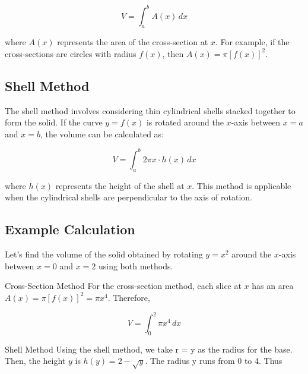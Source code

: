 \documentclass{article}
\begin{document}
\[
V = \int_{a}^{b} A(x) \, dx
\]

where $A(x)$ represents the area of the cross-section at $x$. For example, if the cross-sections are circles with radius $f(x)$, then $A(x) = \pi [f(x)]^2$.

\subsection{Shell Method}
The shell method involves considering thin cylindrical shells stacked together to form the solid. If the curve $y = f(x)$ is rotated around the $x$-axis between $x = a$ and $x = b$, the volume can be calculated as:

\[
V = \int_{a}^{b} 2\pi x \cdot h(x) \, dx
\]

where $h(x)$ represents the height of the shell at $x$. This method is applicable when the cylindrical shells are perpendicular to the axis of rotation.

\subsection{Example Calculation}
Let's find the volume of the solid obtained by rotating $y = x^2$ around the $x$-axis between $x = 0$ and $x = 2$ using both methods.

{Cross-Section Method}
For the cross-section method, each slice at $x$ has an area $A(x) = \pi [f(x)]^2 = \pi x^4$. Therefore,

\[
V = \int_{0}^{2} \pi x^4 \, dx
\]

{Shell Method}
Using the shell method, we take r = y as the radius for the base. Then, the height $y$ is $h(y) = 2 - \sqrt{y}$. The radius y runs from 0 to 4. Thus
\end{document}
